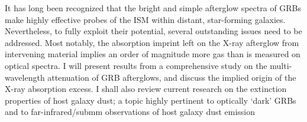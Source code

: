 


\bigskip



\bigskip

\noindent It has long been recognized that the bright and simple afterglow spectra of GRBs make highly effective probes of the ISM within distant, star-forming galaxies. Nevertheless, to fully exploit their potential, several outstanding issues need to be addressed. Most notably, the absorption imprint left on the X-ray afterglow from intervening material implies an order of magnitude more gas than is measured on optical spectra. I will present results from a comprehensive study on the multi-wavelength attenuation of GRB afterglows, and discuss the implied origin of the X-ray absorption excess. I shall also review current research on the extinction properties of host galaxy dust; a topic highly pertinent to optically `dark’ GRBs and to far-infrared/submm observations of host galaxy dust emission
